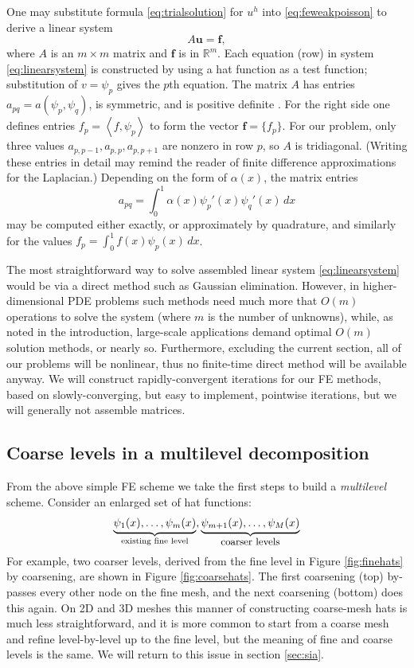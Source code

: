 \documentclass[letterpaper,final,12pt,reqno]{amsart}
\theoremstyle{claim}
\newcommand{\RR}{\mathbb{R}}
\newcommand{\bbf}{\mathbf{f}}
\newcommand{\bu}{\mathbf{u}}
\newcommand{\ip}[2]{\left<#1,#2\right>}
\numberwithin{equation}{section}
\numberwithin{figure}{section}
\numberwithin{table}{section}
\begin{document}
One may substitute formula \eqref{eq:trialsolution} for $u^h$ into \eqref{eq:feweakpoisson} to derive a linear system
\begin{equation}
A \bu = \bbf, \label{eq:linearsystem}
\end{equation}
where $A$ is an $m\times m$ matrix and $\bbf$ is in $\RR^m$.  Each equation (row) in system \eqref{eq:linearsystem} is constructed by using a hat function as a test function; substitution of $v=\psi_p$ gives the $p$th equation.  The matrix $A$ has entries $a_{pq} = a(\psi_p,\psi_q)$, is symmetric, and is positive definite \cite{Elmanetal2014}.  For the right side one defines entries $f_p = \ip{f}{\psi_p}$ to form the vector $\bbf = \{f_p\}$.  For our problem, only three values $a_{p,p-1}, a_{p,p}, a_{p,p+1}$ are nonzero in row $p$, so $A$ is tridiagonal.  (Writing these entries in detail may remind the reader of finite difference approximations for the Laplacian.)  Depending on the form of $\alpha(x)$, the matrix entries
\begin{equation}
  a_{pq} = \int_0^1 \alpha(x) \psi_p'(x) \psi_q'(x)\,dx \label{eq:poissonentries}
\end{equation}
may be computed either exactly, or approximately by quadrature, and similarly for the values $f_p = \int_0^1 f(x) \psi_p(x)\,dx$.

The most straightforward way to solve assembled linear system \eqref{eq:linearsystem} would be via a direct method such as Gaussian elimination.  However, in higher-dimensional PDE problems such methods need much more that $O(m)$ operations to solve the system (where $m$ is the number of unknowns), while, as noted in the introduction, large-scale applications demand optimal $O(m)$ solution methods, or nearly so.  Furthermore, excluding the current section, all of our problems will be nonlinear, thus no finite-time direct method will be available anyway.  We will construct rapidly-convergent iterations for our FE methods, based on slowly-converging, but easy to implement, pointwise iterations, but we will generally not assemble matrices.

\subsection*{Coarse levels in a multilevel decomposition}  From the above simple FE scheme we take the first steps to build a \emph{multilevel} scheme.  Consider an enlarged set of hat functions:
    $$\underbrace{\psi_1(x),\dots,\psi_m(x)}_{\text{existing fine level}},\underbrace{\psi_{m+1}(x),\dots,\psi_M(x)}_{\text{\small coarser levels}}$$
For example, two coarser levels, derived from the fine level in Figure \ref{fig:finehats} by coarsening, are shown in Figure \ref{fig:coarsehats}.  The first coarsening (top) by-passes every other node on the fine mesh, and the next coarsening (bottom) does this again.  On 2D and 3D meshes this manner of constructing coarse-mesh hats is much less straightforward, and it is more common to start from a coarse mesh and refine level-by-level up to the fine level, but the meaning of fine and coarse levels is the same.  We will return to this issue in section \ref{sec:sia}.
\end{document}
